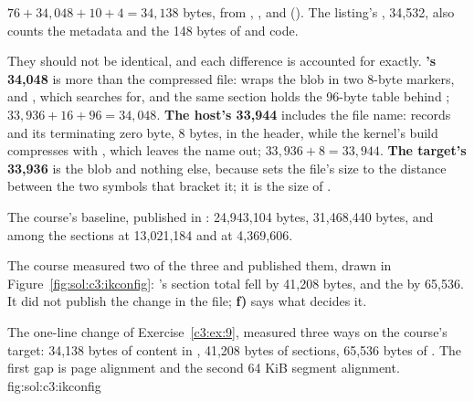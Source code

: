  $76 + 34{,}048 + 10 + 4 = 34{,}138$ bytes, from , ,
 and  (). The listing's ,
34,532, also counts the metadata and the 148 bytes of  and  code.

 They should not be identical, and each difference is accounted for exactly.
\textbf{'s 34,048} is more than the compressed file:  wraps
the blob in two 8-byte markers,  and , which
 searches for, and the same section holds the 96-byte
 table behind ; $33{,}936 + 16 + 96 = 34{,}048$. \textbf{The
host's 33,944} includes the file name:  records  and its terminating zero
byte, 8 bytes, in the header, while the kernel's build compresses with , which leaves
the name out; $33{,}936 + 8 = 33{,}944$. \textbf{The target's 33,936} is the blob and nothing else,
because  sets the file's size to the distance between the two symbols that
bracket it; it is the size of .

 The course's baseline, published in :  24,943,104 bytes,
 31,468,440 bytes, and among the sections  at 13,021,184 and
 at 4,369,606.

 The course measured two of the three and published them, drawn in
Figure~\ref{fig:sol:c3:ikconfig}: 's section total fell by 41,208 bytes, and the
 by 65,536. It did not publish the change in the  file; \textbf{f)} says
what decides it.

  {The one-line change of Exercise~\ref{c3:ex:9}, measured three ways on the course's target: 34,138
   bytes of content in , 41,208 bytes of  sections, 65,536 bytes of
   . The first gap is page alignment and the second 64 KiB segment alignment.}
  {fig:sol:c3:ikconfig}


